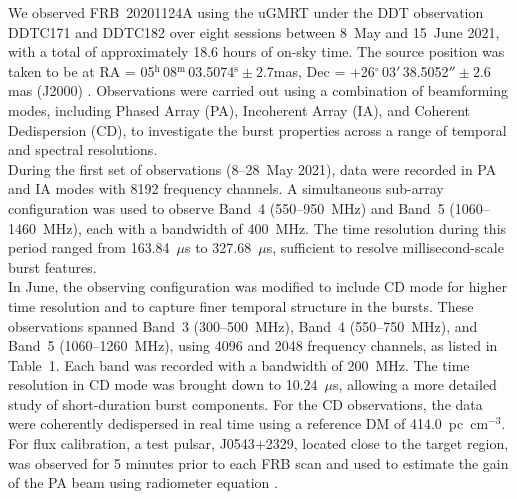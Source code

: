 \documentclass[preprint2, trackchanges]{aastex631}
\begin{document}
We observed FRB~20201124A using the uGMRT under the DDT observation DDTC171 and DDTC182 over eight sessions between 8~May and 15~June 2021, with a total of approximately 18.6 hours of on-sky time. The source position was taken to be at RA = 05$^{\mathrm{h}}$\,08$^{\mathrm{m}}$\,03.5074$^{\mathrm{s}}\pm 2.7$mas, Dec = +26$^\circ$\,03$'$\,38.5052$''\pm 2.6$mas (J2000) \citep{Nimmo_2022}. Observations were carried out using a combination of beamforming modes, including Phased Array (PA), Incoherent Array (IA), and Coherent Dedispersion (CD), to investigate the burst properties across a range of temporal and spectral resolutions.
\\
During the first set of observations (8–28~May 2021), data were recorded in PA and IA modes with 8192 frequency channels. A simultaneous sub-array configuration was used to observe Band~4 (550–950~MHz) and Band~5 (1060–1460~MHz), each with a bandwidth of 400~MHz. %
The time resolution during this period ranged from 163.84~$\mu$s to 327.68~$\mu$s, sufficient to resolve millisecond-scale burst features.
\\
In June, the observing configuration was modified to include CD mode for higher time resolution and to capture finer temporal structure in the bursts. These observations spanned Band~3 (300–500~MHz), Band~4 (550–750~MHz), and Band~5 (1060–1260~MHz), using 4096 and 2048 frequency channels, as listed in Table~1. Each band was recorded with a bandwidth of 200~MHz. The time resolution in CD mode was brought down to 10.24~$\mu$s, allowing a more detailed study of short-duration burst components. For the CD observations, the data were coherently dedispersed in real time using a reference DM of 414.0~pc~cm$^{-3}$.
\\
For flux calibration, a test pulsar,  J0543$+$2329, located close to the target region, was observed for 5 minutes prior to each FRB scan and used to estimate the gain of the PA beam using radiometer equation \citep{lorimer_handbook}.
\end{document}
